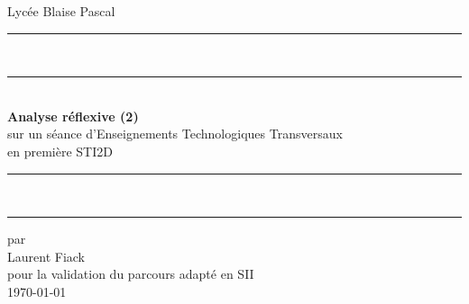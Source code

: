 \begin{titlepage}
\thispagestyle{empty}
\newcommand{\HRule}[2]{\centering\rule{#1}{#2}}

Lycée Blaise Pascal
\vspace{20em}
\begin{center}

	\HRule{\linewidth}{0.5mm}\\
	\vspace{-0.35cm}
	\HRule{\linewidth}{0.3mm}\\
	\textbf{
	\LARGE
	Analyse réflexive (2)\\
	}
	\large
	sur un séance d'Enseignements Technologiques Transversaux\\
	en première STI2D
	\HRule{\linewidth}{0.3mm}\\
	\vspace{-0.45cm}
	\HRule{\linewidth}{0.5mm}

	\vspace{10em}

	par\\
	Laurent Fiack\\

	\vspace{3em}
	pour la validation du parcours adapté en SII\\
	\vspace{3em}
	\today{}

\end{center}

\end{titlepage}    
